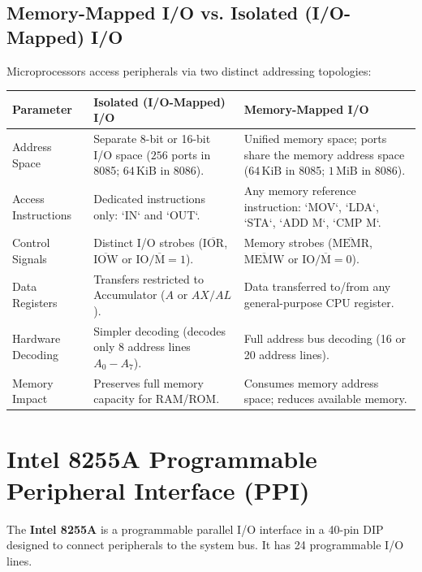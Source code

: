 \documentclass[12pt,a4paper]{article}
\begin{document}
\subsection{Memory-Mapped I/O vs. Isolated (I/O-Mapped) I/O}
Microprocessors access peripherals via two distinct addressing topologies:
\par\vspace{6pt}\noindent
\begingroup
\setlength{\extrarowheight}{2.5pt}
\noindent\begin{tabularx}{\linewidth}{|B{3.2cm}|Y|Y|}
\hline
\textbf{Parameter} & \textbf{Isolated (I/O-Mapped) I/O} & \textbf{Memory-Mapped I/O} \\ \hline
Address Space & Separate 8-bit or 16-bit I/O space ($256$ ports in 8085; $64\,\mathrm{KiB}$ in 8086). & Unified memory space; ports share the memory address space ($64\,\mathrm{KiB}$ in 8085; $1\,\mathrm{MiB}$ in 8086). \\ \hline
Access Instructions & Dedicated instructions only: `IN` and `OUT`. & Any memory reference instruction: `MOV`, `LDA`, `STA`, `ADD M`, `CMP M`. \\ \hline
Control Signals & Distinct I/O strobes ($\overline{\mathrm{IOR}}$, $\overline{\mathrm{IOW}}$ or $\mathrm{IO}/\overline{\mathrm{M}}=1$). & Memory strobes ($\overline{\mathrm{MEMR}}$, $\overline{\mathrm{MEMW}}$ or $\mathrm{IO}/\overline{\mathrm{M}}=0$). \\ \hline
Data Registers & Transfers restricted to Accumulator ($A$ or $AX/AL$). & Data transferred to/from any general-purpose CPU register. \\ \hline
Hardware Decoding & Simpler decoding (decodes only 8 address lines $A_0-A_7$). & Full address bus decoding (16 or 20 address lines). \\ \hline
Memory Impact & Preserves full memory capacity for RAM/ROM. & Consumes memory address space; reduces available memory. \\ \hline
\end{tabularx}\par
\endgroup

\section{Intel 8255A Programmable Peripheral Interface (PPI)}

\begin{tcolorbox}[defbox, title={Intel 8255A Architectural Overview}]
The \textbf{Intel 8255A} is a programmable parallel I/O interface in a 40-pin DIP designed to connect peripherals to the system bus. It has 24 programmable I/O lines.
\end{tcolorbox}
\end{document}
